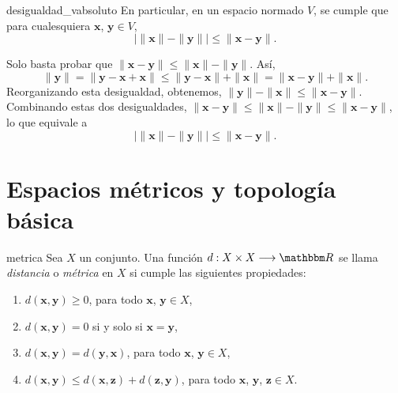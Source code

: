 \begin{corollary}{}{desigualdad_vabsoluto}
    En particular, en un espacio normado $V$, se cumple que para cualesquiera $\mathbf{x}$, $\mathbf{y} \in V$,
    $$\big| \| \mathbf{x} \| - \| \mathbf{y} \| \big| \leq \| \mathbf{x} - \mathbf{y} \|.$$

    \tcblower
    \demostracion Solo basta probar que $\| \mathbf{x} - \mathbf{y} \| \leq \| \mathbf{x} \| - \| \mathbf{y} \|$. Así,
    $$\| \mathbf{y} \| = \| \mathbf{y} - \mathbf{x} + \mathbf{x} \| \leq \| \mathbf{y} - \mathbf{x} \| + \| \mathbf{x} \| = \| \mathbf{x} - \mathbf{y} \| + \| \mathbf{x} \|.$$
    Reorganizando esta desigualdad, obtenemos, $\| \mathbf{y} \| - \| \mathbf{x} \| \leq \| \mathbf{x} - \mathbf{y} \|$. Combinando estas dos desigualdades, $\| \mathbf{x} - \mathbf{y} \| \leq \| \mathbf{x} \| - \| \mathbf{y} \| \leq \| \mathbf{x} - \mathbf{y} \|$, lo que equivale a
    $$\big| \| \mathbf{x} \| - \| \mathbf{y} \| \big| \leq \| \mathbf{x} - \mathbf{y} \|.$$
\end{corollary}

\newpage

\section{Espacios métricos y topología básica}

\begin{definicion}{}{metrica}
    Sea $X$ un conjunto. Una función $d: X \times X \longrightarrow \RR$ se llama \emph{distancia} o \emph{métrica} en $X$ si cumple las siguientes propiedades:
    \begin{enumerate}[label=\roman*), topsep=6pt, itemsep=0pt]
        \item $d(\mathbf{x}, \mathbf{y}) \geq 0$, para todo $\mathbf{x}$, $\mathbf{y} \in X$,
        \item $d(\mathbf{x}, \mathbf{y}) = 0$ si y solo si $\mathbf{x} = \mathbf{y}$,
        \item $d(\mathbf{x}, \mathbf{y}) = d(\mathbf{y}, \mathbf{x})$, para todo $\mathbf{x}$, $\mathbf{y} \in X$,
        \item $d(\mathbf{x}, \mathbf{y}) \leq d(\mathbf{x}, \mathbf{z}) + d(\mathbf{z}, \mathbf{y})$, para todo $\mathbf{x}$, $\mathbf{y}$, $\mathbf{z} \in X$.
    \end{enumerate}
\end{definicion}

